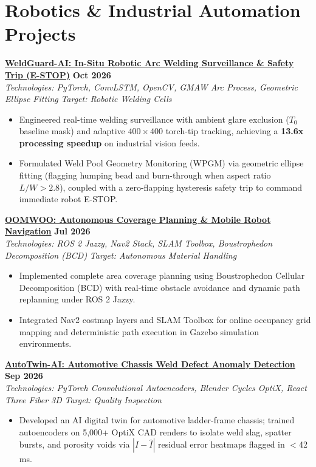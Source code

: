 \documentclass[letterpaper,10pt]{article}
\begin{document}
\section{Robotics \& Industrial Automation Projects}
\noindent
\href{https://github.com/Arkz-Deepak/WeldGuard-AI}{\textbf{WeldGuard-AI: In-Situ Robotic Arc Welding Surveillance \& Safety Trip (E-STOP)}} \hfill \textbf{Oct 2026} \\
\textit{Technologies: PyTorch, ConvLSTM, OpenCV, GMAW Arc Process, Geometric Ellipse Fitting} \hfill \textit{Target: Robotic Welding Cells} \\
\begin{itemize}
    \item Engineered real-time welding surveillance with ambient glare exclusion ($T_0$ baseline mask) and adaptive $400\times400$ torch-tip tracking, achieving a \textbf{13.6x processing speedup} on industrial vision feeds.
    \item Formulated Weld Pool Geometry Monitoring (WPGM) via geometric ellipse fitting (flagging humping bead and burn-through when aspect ratio $L/W > 2.8$), coupled with a zero-flapping hysteresis safety trip to command immediate robot E-STOP.
\end{itemize}
\vspace{2pt}

\noindent
\href{https://github.com/Arkz-Deepak/oomwoo-clean-and-map-arkz}{\textbf{OOMWOO: Autonomous Coverage Planning \& Mobile Robot Navigation}} \hfill \textbf{Jul 2026} \\
\textit{Technologies: ROS 2 Jazzy, Nav2 Stack, SLAM Toolbox, Boustrophedon Decomposition (BCD)} \hfill \textit{Target: Autonomous Material Handling} \\
\begin{itemize}
    \item Implemented complete area coverage planning using Boustrophedon Cellular Decomposition (BCD) with real-time obstacle avoidance and dynamic path replanning under ROS 2 Jazzy.
    \item Integrated Nav2 costmap layers and SLAM Toolbox for online occupancy grid mapping and deterministic path execution in Gazebo simulation environments.
\end{itemize}
\vspace{2pt}

\noindent
\href{https://github.com/Arkz-Deepak/AutoTwin-AI}{\textbf{AutoTwin-AI: Automotive Chassis Weld Defect Anomaly Detection}} \hfill \textbf{Sep 2026} \\
\textit{Technologies: PyTorch Convolutional Autoencoders, Blender Cycles OptiX, React Three Fiber 3D} \hfill \textit{Target: Quality Inspection} \\
\begin{itemize}
    \item Developed an AI digital twin for automotive ladder-frame chassis; trained autoencoders on 5,000+ OptiX CAD renders to isolate weld slag, spatter bursts, and porosity voids via $|I - \hat{I}|$ residual error heatmaps flagged in $<$42 ms.
\end{itemize}
\vspace{2pt}
\end{document}
